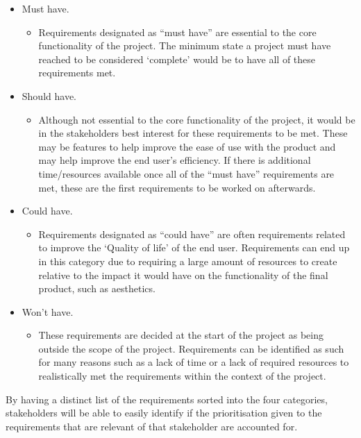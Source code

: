 \documentclass[12pt,a4paper]{article}
\begin{document}
\begin{itemize}
    \item Must have.
    \begin{itemize}
        \item Requirements designated as ``must have'' are essential to the core functionality of the project. The minimum state a project must have reached to be considered `complete' would be to have all of these requirements met.
    \end{itemize}
    \item Should have.
    \begin{itemize}
        \item Although not essential to the core functionality of the project, it would be in the stakeholders best interest for these requirements to be met. These may be features to help improve the ease of use with the product and may help improve the end user's efficiency. If there is additional time/resources available once all of the ``must have'' requirements are met, these are the first requirements to be worked on afterwards.
    \end{itemize}
    \item Could have.
    \begin{itemize}
        \item Requirements designated as ``could have'' are often requirements related to improve the `Quality of life' of the end user. Requirements can end up in this category due to requiring a large amount of resources to create relative to the impact it would have on the functionality of the final product, such as aesthetics.
    \end{itemize}
    \item Won't have.
    \begin{itemize}
        \item These requirements are decided at the start of the project as being outside the scope of the project. Requirements can be identified as such for many reasons such as a lack of time or a lack of required resources to realistically met the requirements within the context of the project.
    \end{itemize}
\end{itemize}

By having a distinct list of the requirements sorted into the four categories, stakeholders will be able to easily identify if the prioritisation given to the requirements that are relevant of that stakeholder are accounted for.
\end{document}
